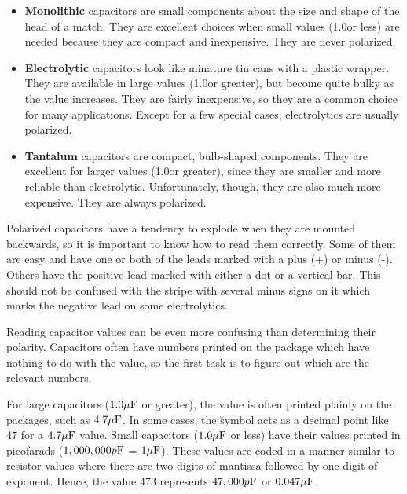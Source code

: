 \begin{itemize}

 \item {\bf Monolithic} capacitors are small components about the size
 and shape of the head of a match. They are excellent choices when
 small values (1.0\uF or less) are needed because they are compact and
 inexpensive. They are never polarized.

 \item {\bf Electrolytic} capacitors look like minature tin cans with
 a plastic wrapper. They are available in large values (1.0\uF or
 greater), but become quite bulky as the value increases. They are
 fairly inexpensive, so they are a common choice for many
 applications. Except for a few special cases, electrolytics are
 usually polarized.

 \item {\bf Tantalum} capacitors are compact, bulb-shaped
 components. They are excellent for larger values (1.0\uF or greater),
 since they are smaller and more reliable than
 electrolytic. Unfortunately, though, they are also much more
 expensive. They are always polarized.

\end{itemize}

Polarized capacitors have a tendency to explode when they are mounted
backwards, so it is important to know how to read them correctly. Some
of them are easy and have one or both of the leads marked with a plus
(+) or minus (-). Others have the positive lead marked with either a
dot or a vertical bar. This should not be confused with the stripe
with several minus signs on it which marks the negative lead on some
electrolytics.

Reading capacitor values can be even more confusing than determining
their polarity. Capacitors often have numbers printed on the package
which have nothing to do with the value, so the first task is to
figure out which are the relevant numbers.

For large capacitors ($1.0\mu{\rm F}$ or greater), the value is often printed
plainly on the packages, such as $4.7\mu{\rm F}$. In some cases, the \u
symbol acts as a decimal point like 4\u7 for a $4.7\mu{\rm F}$ value. Small
capacitors ($1.0\mu{\rm F}$ or less) have their values printed in picofarads
($1,000,000p{\rm F}$ = $1\mu{\rm F}$). These values are coded in a manner similar to
resistor values where there are two digits of mantissa followed by one
digit of exponent. Hence, the value 473 represents $47,000p{\rm F}$ or
$0.047\mu{\rm F}$.

